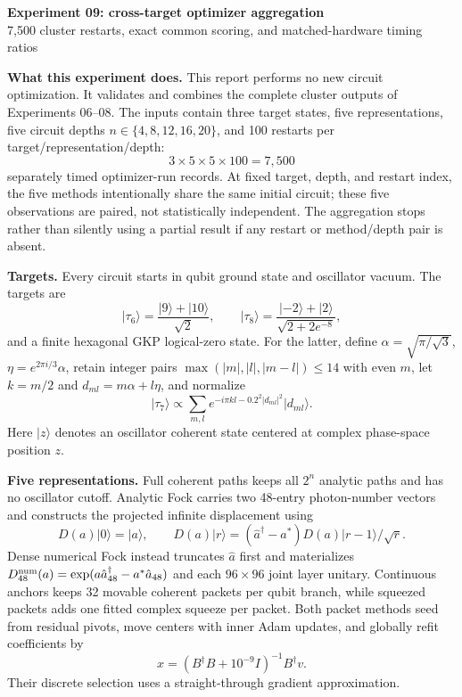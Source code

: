 \documentclass[10pt]{article}
\newcommand{\ket}[1]{\lvert #1\rangle}
\begin{document}
\begin{center}
{\Large\bfseries Experiment 09: cross-target optimizer aggregation}\\[-1pt]
{\small 7,500 cluster restarts, exact common scoring, and matched-hardware timing ratios}
\end{center}

\textbf{What this experiment does.}
This report performs no new circuit optimization. It validates and combines
the complete cluster outputs of Experiments 06--08. The inputs contain three
target states, five representations, five circuit depths
$n\in\{4,8,12,16,20\}$, and 100 restarts per target/representation/depth:
\[
3\times5\times5\times100=7{,}500
\]
separately timed optimizer-run records. At fixed target, depth, and restart
index, the five methods intentionally share the same initial circuit; these
five observations are paired, not statistically independent. The aggregation
stops rather than silently using a partial result if any restart or method/depth
pair is absent.

\textbf{Targets.}
Every circuit starts in qubit ground state and oscillator vacuum. The targets
are
\[
\ket{\tau_6}=\frac{\ket9+\ket{10}}{\sqrt2},\qquad
\ket{\tau_8}=\frac{\ket{-2}+\ket2}{\sqrt{2+2e^{-8}}},
\]
and a finite hexagonal GKP logical-zero state. For the latter, define
$\alpha=\sqrt{\pi/\sqrt3}$, $\eta=e^{2\pi i/3}\alpha$, retain integer pairs
$\max(|m|,|l|,|m-l|)\le14$ with even $m$, let $k=m/2$ and
$d_{ml}=m\alpha+l\eta$, and normalize
\[
\ket{\tau_7}\propto\sum_{m,l}
e^{-i\pi kl-0.2^2|d_{ml}|^2}\ket{d_{ml}}.
\]
Here $\ket z$ denotes an oscillator coherent state centered at complex
phase-space position $z$.

\textbf{Five representations.}
Full coherent paths keeps all $2^n$ analytic paths and has no oscillator
cutoff. Analytic Fock carries two 48-entry photon-number vectors and constructs
the projected infinite displacement using
\[
D(a)\ket0=\ket a,\qquad
D(a)\ket r=(\hat a^\dagger-a^*)D(a)\ket{r-1}/\sqrt r.
\]
Dense numerical Fock instead truncates $\hat a$ first and materializes
$D_{48}^{\rm num}(a)=\exp(a\hat a_{48}^\dagger-a^*\hat a_{48})$ and each
$96\times96$ joint layer unitary. Continuous anchors keeps 32 movable coherent
packets per qubit branch, while squeezed packets adds one fitted complex
squeeze per packet. Both packet methods seed from residual pivots, move centers
with inner Adam updates, and globally refit coefficients by
\[
x=(B^\dagger B+10^{-9}I)^{-1}B^\dagger v.
\]
Their discrete selection uses a straight-through gradient approximation.
\end{document}
